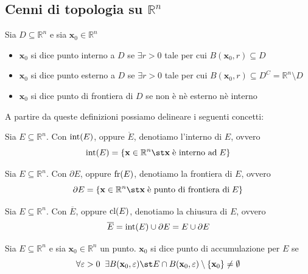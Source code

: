     \subsection{Cenni di topologia su \texorpdfstring{$\mathbb{R}^{n}$}{R alla n}}
        Sia $D \subseteq \mathbb{R}^{n}$ e sia $\mathbf{x}_0 \in \mathbb{R}^{n}$
        \begin{itemize}
            \item $\mathbf{x}_0$ si dice punto interno a $D$ se $\exists r > 0$ tale per cui $B(\mathbf{x}_0, r) \subseteq D$
            \item $\mathbf{x}_0$ si dice punto esterno a $D$ se $\exists r > 0$ tale per cui $B(\mathbf{x}_0, r) \subseteq D^{C} = \mathbb{R}^{n} \setminus D$
            \item $\mathbf{x}_0$ si dice punto di frontiera di $D$ se non è nè esterno nè interno
        \end{itemize}

        A partire da queste definizioni possiamo delineare i seguenti concetti:
        \begin{definition} 
            Sia $E \subseteq \mathbb{R}^{n}$. Con $\textnormal{int}(E)$, oppure $\mathring{E}$, denotiamo l'interno di $E$, ovvero
            \[
                \textnormal{int}(E) = \{ \mathbf{x} \in \mathbb{R}^{n} \st \mathbf{x} \; \textnormal{è interno ad} \; E \}
            \]
        \end{definition}

        \begin{definition} 
            Sia $E \subseteq \mathbb{R}^{n}$. Con $\partial E$, oppure $\textnormal{fr}(E)$, denotiamo la frontiera di $E$, ovvero
            \[
                \partial E = \{ \mathbf{x} \in \mathbb{R}^{n} \st \mathbf{x} \; \textnormal{è punto di frontiera di} \; E \}
            \]
        \end{definition}

        \begin{definition} 
            Sia $E \subseteq \mathbb{R}^{n}$. Con $\overline{E}$, oppure $\textnormal{cl}(E)$, denotiamo la chiusura di $E$, ovvero
            \[
                \overline E = \textnormal{int}(E) \cup \partial E = E \cup \partial E
            \]
        \end{definition}

        \begin{definition} 
            Sia $E \subseteq \mathbb{R}^{n}$ e sia $\mathbf{x}_0 \in \mathbb{R}^{n}$ un punto. $\mathbf{x}_0$ si dice punto di accumulazione per $E$ se
            \[
                \forall \varepsilon > 0 \;\; \exists B(\mathbf{x}_0, \varepsilon) \st E \cap B(\mathbf{x}_0, \varepsilon) \setminus \{\mathbf{x}_0\} \neq \emptyset
            \]
        \end{definition}

